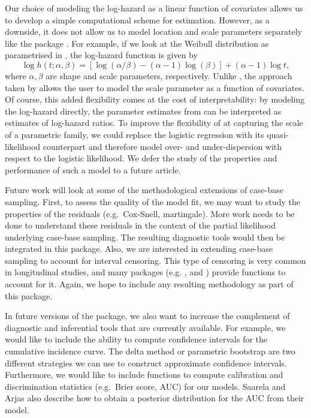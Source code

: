 \documentclass[
]{jss}
\begin{document}
Our choice of modeling the log-hazard as a linear function of covariates
allows us to develop a simple computational scheme for estimation.
However, as a downside, it does not allow us to model location and scale
parameters separately like the package . For example, if
we look at the Weibull distribution as parametrised in
, the log-hazard function is given by
\[ \log h(t; \alpha, \beta) = \left[\log(\alpha/\beta) - (\alpha - 1)\log(\beta)\right] + (\alpha - 1)\log t,\]
where \(\alpha,\beta\) are shape and scale parameters, respectively.
Unlike , the approach taken by  allows the
user to model the scale parameter as a function of covariates. Of
course, this added flexibility comes at the cost of interpretability: by
modeling the log-hazard directly, the parameter estimates from
 can be interpreted as estimates of log-hazard ratios. To
improve the flexibility of  at capturing the scale of a
parametric family, we could replace the logistic regression with its
quasi-likelihood counterpart and therefore model over- and
under-dispersion with respect to the logistic likelihood. We defer the
study of the properties and performance of such a model to a future
article.

Future work will look at some of the methodological extensions of
case-base sampling. First, to assess the quality of the model fit, we
may want to study the properties of the residuals (e.g.~Cox-Snell,
martingale). More work needs to be done to understand these residuals in
the context of the partial likelihood underlying case-base sampling. The
resulting diagnostic tools would then be integrated in this package.
Also, we are interested in extending case-base sampling to account for
interval censoring. This type of censoring is very common in
longitudinal studies, and many packages (e.g. ,
 and ) provide functions to account for it.
Again, we hope to include any resulting methodology as part of this
package.

In future versions of the package, we also want to increase the
complement of diagnostic and inferential tools that are currently
available. For example, we would like to include the ability to compute
confidence intervals for the cumulative incidence curve. The delta
method or parametric bootstrap are two different strategies we can use
to construct approximate confidence intervals. Furthermore, we would
like to include functions to compute calibration and discrimination
statistics (e.g.~Brier score, AUC) for our models. Saarela and Arjas
\citeyearpar{saarela2015non} also describe how to obtain a posterior
distribution for the AUC from their model.
\end{document}
